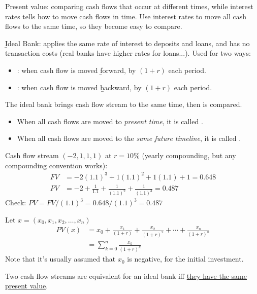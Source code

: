Present value: comparing cash flows that occur at different times, while interest rates tells how to move cash flows in time. Use interest rates to move all cash flows to the same time, so they become easy to compare.

\b{Ideal Bank}: applies the same rate of interest to deposits and loans, and has no transaction costs (real banks have higher rates for loans...).
Used for two ways:
\begin{itemize}
    \item {}: when cash flow is moved \b{forward},  by $(1+r)$ each period.
    \item {}: when cash flow is moved \b{backward},  by $(1+r)$ each period.
\end{itemize}

The ideal bank brings cash flow stream to the same time, then is compared.
\begin{itemize}
    \item When all cash flows are moved to \textit{present time}, it is called .
    \item When all cash flows are moved to the \textit{same future timeline}, it is called .
\end{itemize}

\begin{example}
    Cash flow stream $(-2,1,1,1)$ at $r = 10\%$ (yearly compounding, but any compounding convention works):
    \begin{align*}
        FV &= -2(1.1)^3 + 1(1.1)^2 + 1(1.1) + 1 = 0.648\\
        PV &= -2 + \frac{1}{1.1} + \frac{1}{(1.1)^2} + \frac{1}{(1.1)^3} = 0.487
    \end{align*}
    Check: $PV = FV/(1.1)^3 = 0.648/(1.1)^3 = 0.487$
\end{example}

Let $x = (x_0, x_1, x_2, \dots, x_n)$
\begin{align*}
    PV(x) &= x_0 + \frac{x_1}{(1+r)} + \frac{x_2}{(1+r)^2} + \cdots + \frac{x_n}{(1+r)^n} \\
    &= \boxed{\sum_{k=0}^{n}\frac{x_k}{(1+r)^k}}
\end{align*}
Note that it's usually assumed that $x_0$ is negative, for the initial investment.


Two cash flow streams are equivalent for an ideal bank iff \underline{they have the same present value}.

